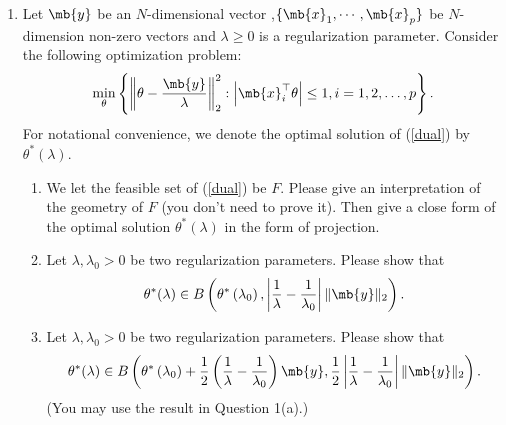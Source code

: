 \begin{exercise}
\begin{enumerate}
      
    \item Let $\mb{y}$ be an $N$-dimensional vector ,$\{\mb{x}_1,\cdots,\mb{x}_p\}$ be $N$-dimension non-zero vectors and $\lambda\ge 0$ is a regularization parameter. Consider the following optimization problem:
      \begin{align}\label{dual}
        \min_{\theta}\left\{\left\|\theta-\frac{\mb{y}}{\lambda}\right\|_{2}^{2}:\left|\mb{x}_{i}^\top \theta\right| \leq 1, i=1,2, \ldots, p\right\}.
      \end{align}
      For notational convenience, we denote the optimal solution of (\ref{dual}) by $\theta^*(\lambda)$.
      \begin{enumerate}
        \item We let the feasible set of (\ref{dual}) be $F$. Please give an interpretation of the geometry of $F$ (you don't need to prove it). Then give a close form of the optimal solution $\theta^*(\lambda)$ in the form of projection.
        \item Let $\lambda, \lambda_{0}>0$ be two regularization parameters. Please show that
          \begin{align*}
            \theta^{*}(\lambda) \in B\left(\theta^{*}\left(\lambda_{0}\right), \left|\frac{1}{\lambda}-\frac{1}{\lambda_{0}}\right|\|\mb{y}\|_{2}\right).
          \end{align*}
          
        \item  Let $\lambda, \lambda_{0}>0$ be two regularization parameters. Please show that
          \begin{align*}
            \theta^{*}(\lambda) \in B\left(\theta^{*}\left(\lambda_{0}\right)+\frac{1}{2}\left(\frac{1}{\lambda}-\frac{1}{\lambda_{0}}\right) \mb{y}, \frac{1}{2}\left|\frac{1}{\lambda}-\frac{1}{\lambda_{0}}\right|\|\mb{y}\|_{2}\right).
          \end{align*}
          (You may use the result in Question 1(a).)
          

\end{enumerate}
\end{enumerate}
\end{exercise}
